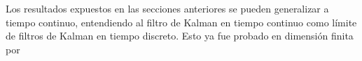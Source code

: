 Los resultados expuestos en las secciones anteriores se pueden generalizar a tiempo continuo, entendiendo al filtro de Kalman en tiempo continuo como límite de filtros de Kalman en tiempo discreto. Esto ya fue probado en dimensión finita por \cite{Lange2022DerivationCoefficients, Kelly2014Well-posednessTime, Shaid1999TheFilter}